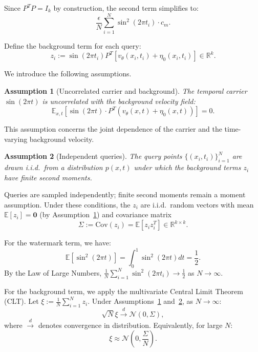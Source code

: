 \documentclass[11pt]{article}
\newtheorem{assumption}{Assumption}
\begin{document}
Since $P^T P = I_k$ by construction, the second term simplifies to:
\begin{equation}
\frac{\epsilon}{N}\sum_{i=1}^N \sin^2(2\pi t_i) \cdot c_m.
\end{equation}

Define the background term for each query:
\begin{equation}
z_i := \sin(2\pi t_i) P^T [v_\theta(x_i, t_i) + \eta_0(x_i, t_i)] \in \mathbb{R}^k.
\end{equation}

We introduce the following assumptions.

\begin{assumption}[Uncorrelated carrier and background]\label{ass:uncorrelated}
The temporal carrier $\sin(2\pi t)$ is uncorrelated with the background
velocity field:
\begin{equation}
\mathbb{E}_{x,t}[\sin(2\pi t) \cdot P^T(v_\theta(x,t) + \eta_0(x,t))] = 0.
\end{equation}
\end{assumption}

This assumption concerns the joint dependence of the carrier and the
time-varying background velocity.

\begin{assumption}[Independent queries]\label{ass:iid}
The query points $\{(x_i, t_i)\}_{i=1}^N$ are drawn i.i.d.~from a
distribution $p(x,t)$ under which the background terms $z_i$ have finite
second moments.
\end{assumption}

Queries are sampled independently; finite second moments remain a
moment assumption. Under these conditions, the $z_i$ are i.i.d.~random vectors
with mean $\mathbb{E}[z_i] = \mathbf{0}$ (by Assumption~\ref{ass:uncorrelated})
and covariance matrix
\begin{equation}
\Sigma := \text{Cov}(z_i) = \mathbb{E}[z_i z_i^T] \in \mathbb{R}^{k \times k}.
\end{equation}

For the watermark term, we have:
\begin{equation}
\mathbb{E}[\sin^2(2\pi t)] = \int_0^1 \sin^2(2\pi t) dt = \frac{1}{2}.
\end{equation}
By the Law of Large Numbers,
$\frac{1}{N}\sum_{i=1}^N \sin^2(2\pi t_i) \to \frac{1}{2}$ as $N \to \infty$.

For the background term, we apply the multivariate Central Limit Theorem
(CLT). Let $\xi := \frac{1}{N}\sum_{i=1}^N z_i$. Under
Assumptions~\ref{ass:uncorrelated} and~\ref{ass:iid}, as $N \to \infty$:
\begin{equation}
\sqrt{N} \xi \xrightarrow{d} \mathcal{N}(0, \Sigma),
\end{equation}
where $\xrightarrow{d}$ denotes convergence in distribution. Equivalently,
for large $N$:
\begin{equation}
\xi \approx \mathcal{N}\!\left(0, \frac{\Sigma}{N}\right).
\end{equation}
\end{document}
